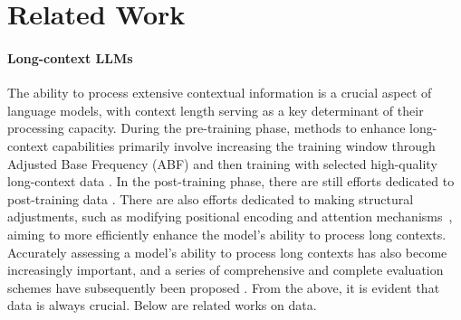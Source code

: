 \section{Related Work}
\paragraph{Long-context LLMs} The ability to process extensive contextual information is a crucial aspect of language models, with context length serving as a key determinant of their processing capacity. During the pre-training phase, methods to enhance long-context capabilities primarily involve increasing the training window through Adjusted Base Frequency (ABF) and then training with selected high-quality long-context data \citep{dubey2024llama,xiong-etal-2024-effective,chen2024long,lv2024longwanjuan}. In the post-training phase, there are still efforts dedicated to post-training data \citep{gao2024train,fu2024dataengineeringscalinglanguage,si2025gateauselectinginfluentialsamples,wang2024bootstrap,Chen2024WhatAT,longalign,wu2024long}. There are also efforts dedicated to making structural adjustments, such as modifying positional encoding \citep{Chen2023ExtendingCW,zhu2023pose,peng2023yarn,ding2024longrope,an2024training,an2024does} and attention mechanisms~\citep{an2024does,jin2024llm}, aiming to more efficiently enhance the model's ability to process long contexts. Accurately assessing a model's ability to process long contexts has also become increasingly important, and a series of comprehensive and complete evaluation schemes have subsequently been proposed \citep{hsieh2024ruler,bai2023longbench, bai2025longbenchv2,kuratov2024babilong,li2024long,zhu-etal-2024-longembed,levy2024same}. From the above, it is evident that data is always crucial. Below are related works on data.

